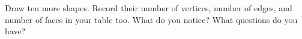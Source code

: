 \documentclass[nooutcomes,noauthor]{ximera}
\begin{document}


\newpage

\begin{question}
Draw ten more shapes. Record their number of vertices, number of edges, and number of faces in your table too.  What do you notice?  What questions do you have?  
\vfill
\end{question}

%
%
%
\end{document}
